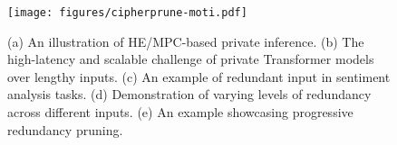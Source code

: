 


\begin{figure}
    \centering    \texttt{[image: figures/cipherprune-moti.pdf]}
    \captionsetup{skip=2pt}
    \vspace{-0.1in}
    \caption{(a) An illustration of HE/MPC-based private inference. (b) The high-latency and scalable challenge of private Transformer models over lengthy inputs. (c) An example of redundant input in sentiment analysis tasks. (d) Demonstration of varying levels of redundancy across different inputs. (e) An example showcasing progressive redundancy pruning.}
    \label{fig:motivation}
\vspace{-0.3in}
\end{figure} 

